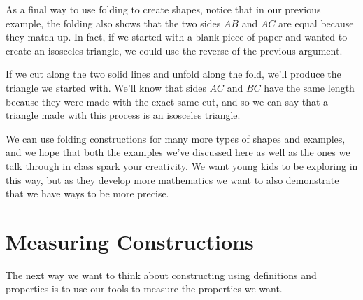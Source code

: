 \documentclass{ximera}
\begin{document}
As a final way to use folding to create shapes, notice that in our previous example, the folding also shows that the two sides $AB$ and $AC$ are equal because they match up. In fact, if we started with a blank piece of paper and wanted to create an isosceles triangle, we could use the reverse of the previous argument.
\begin{image}
\end{image}
If we cut along the two solid lines and unfold along the fold, we'll produce the triangle we started with. We'll know that sides $AC$ and $BC$ have the same length because they were made with the exact same cut, and so we can say that a triangle made with this process is an isosceles triangle.

We can use folding constructions for many more types of shapes and examples, and we hope that both the examples we've discussed here as well as the ones we talk through in class spark your creativity. We want young kids to be exploring in this way, but as they develop more mathematics we want to also demonstrate that we have ways to be more precise.

\section{Measuring Constructions}
The next way we want to think about constructing using definitions and properties is to use our tools to measure the properties we want.
\end{document}
